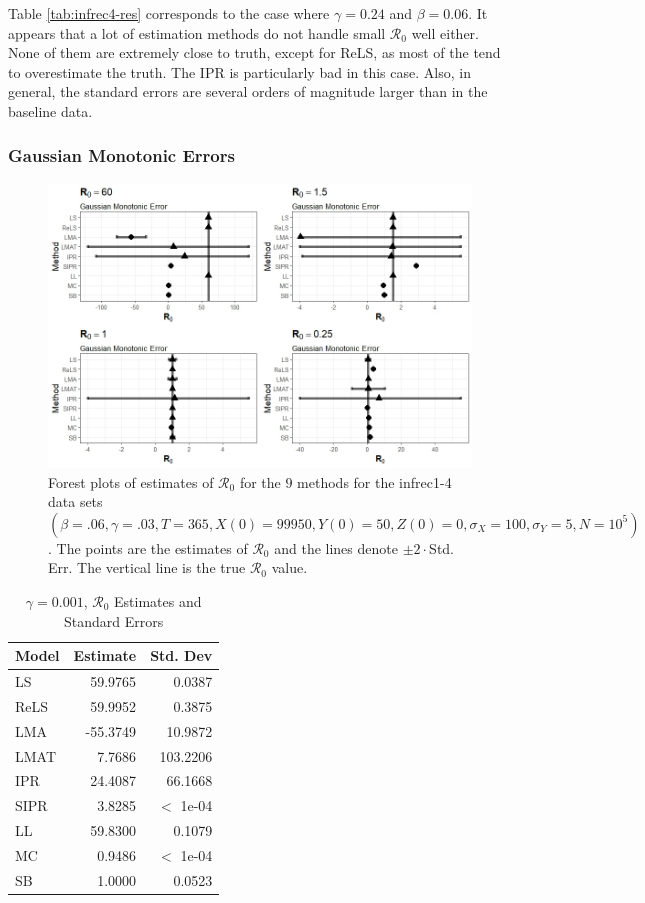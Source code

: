 \documentclass[12pt]{article}
\newcommand{\xxsir}{\ensuremath{9} } %
\newcommand{\rr}{\ensuremath{\mathcal{R}_0}}
\begin{document}
Table \ref{tab:infrec4-res} corresponds to the case where $\gamma = 0.24$ and $\beta=0.06$. It appears that a lot of estimation methods do not handle small $\rr$ well either. None of them are extremely close to truth, except for ReLS, as most of the tend to overestimate the truth. The IPR is particularly bad in this case. Also, in general, the standard errors are several orders of magnitude larger than in the baseline data.

\subsubsection{Gaussian Monotonic Errors}

\begin{figure}[H]
	\centering
	\includegraphics[scale=0.5]{images/parchange_nm.jpeg}
	\caption{Forest plots of estimates of $\rr$ for the \xxsir methods for the infrec1-4 data sets $(\beta=.06, \gamma=.03, T=365, X(0)=99950, Y(0)=50, Z(0)=0, \sigma_X=100, \sigma_Y=5, N=10^5)$.  The points are the estimates of $\rr$ and the lines denote $\pm 2\cdot $Std. Err.  The vertical line is the true $\rr$ value.}
\end{figure}
\begin{table}[H]
	
	\centering
	\begin{tabular}[t]{l|r|r}
		\hline
		Model & Estimate & Std. Dev\\
		\hline
		LS & 59.9765 & 0.0387\\
		\hline
		ReLS & 59.9952 & 0.3875\\
		\hline
		LMA & -55.3749 & 10.9872\\
		\hline
		LMAT & 7.7686 & 103.2206\\
		\hline
		IPR & 24.4087 & 66.1668\\
		\hline
		SIPR & 3.8285 & $<$ 1e-04\\
		\hline
		LL & 59.8300 & 0.1079\\
		\hline
		MC & 0.9486 & $<$ 1e-04\\
		\hline
		SB & 1.0000 & 0.0523\\
		\hline
	\end{tabular}
	\caption{$\gamma = 0.001$, $\rr$ Estimates and Standard Errors}
\end{table}
\end{document}
